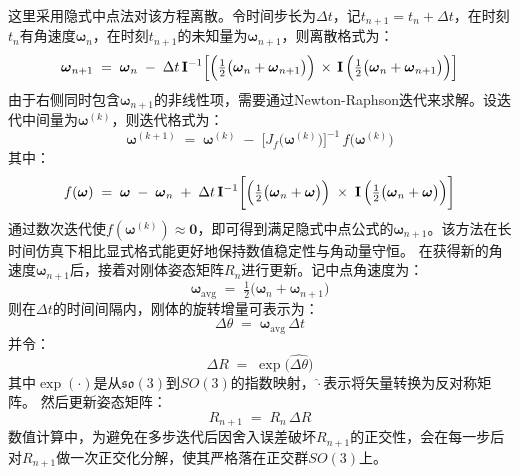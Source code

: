 这里采用隐式中点法对该方程离散。令时间步长为$\Delta t$，记$t_{n+1} = t_n + \Delta t$，在时刻$t_n$有角速度$\boldsymbol{\omega}_n$，在时刻$t_{n+1}$的未知量为$\boldsymbol{\omega}_{n+1}$，则离散格式为：
\begin{equation}\label{eq:midpoint_formula}
	\boldsymbol{\omega}_{n+1}
	\;=\;
	\boldsymbol{\omega}_{n}
	\;-\;
	\Delta t\,\mathbf{I}^{-1}\Bigl[
	\Bigl(\tfrac12\bigl(\boldsymbol{\omega}_{n}+\boldsymbol{\omega}_{n+1}\bigr)\Bigr)
	\,\times\,
	\mathbf{I}\,\Bigl(\tfrac12\bigl(\boldsymbol{\omega}_{n}+\boldsymbol{\omega}_{n+1}\bigr)\Bigr)
	\Bigr]
\end{equation}
由于右侧同时包含$\boldsymbol{\omega}_{n+1}$的非线性项，需要通过Newton-Raphson迭代来求解。设迭代中间量为$\boldsymbol{\omega}^{(k)}$，则迭代格式为：
\begin{equation}
	\boldsymbol{\omega}^{(k+1)}
	\;=\;
	\boldsymbol{\omega}^{(k)}
	\;-\;
	\bigl[J_f\bigl(\boldsymbol{\omega}^{(k)}\bigr)\bigr]^{-1}
	\,f\bigl(\boldsymbol{\omega}^{(k)}\bigr)
\end{equation}
其中：
\begin{equation}
	f(\boldsymbol{\omega})
	\;=\;
	\boldsymbol{\omega}
	\;-\;
	\boldsymbol{\omega}_n
	\;+\;
	\Delta t\,\mathbf{I}^{-1}\biggl[
	\Bigl(\tfrac12\bigl(\boldsymbol{\omega}_n + \boldsymbol{\omega}\bigr)\Bigr)
	\;\times\;
	\mathbf{I}\,
	\Bigl(\tfrac12\bigl(\boldsymbol{\omega}_n + \boldsymbol{\omega}\bigr)\Bigr)
	\biggr]
\end{equation}
通过数次迭代使$f(\boldsymbol{\omega}^{(k)}) \approx \mathbf{0}$，即可得到满足隐式中点公式的$\boldsymbol{\omega}_{n+1}$。该方法在长时间仿真下相比显式格式能更好地保持数值稳定性与角动量守恒。
在获得新的角速度$\boldsymbol{\omega}_{n+1}$后，接着对刚体姿态矩阵$R_n$进行更新。记中点角速度为：
\begin{equation}
	\boldsymbol{\omega}_{\mathrm{avg}}
	\;=\;
	\tfrac12\bigl(
	\boldsymbol{\omega}_n + \boldsymbol{\omega}_{n+1}
	\bigr)
\end{equation}
则在$\Delta t$的时间间隔内，刚体的旋转增量可表示为：
\begin{equation}
	\Delta \theta
	\;=\;
	\boldsymbol{\omega}_{\mathrm{avg}}\,\Delta t
\end{equation}
并令：
\begin{equation}
	\Delta R
	\;=\;
	\exp\bigl(\widehat{\Delta \theta}\bigr)
\end{equation}
其中$\exp(\cdot)$是从$\mathfrak{so}(3)$到$SO(3)$的指数映射，$\widehat{\cdot}$表示将矢量转换为反对称矩阵。	
然后更新姿态矩阵：
\begin{equation}
	R_{n+1}
	\;=\;
	R_{n}\,\Delta R
\end{equation}
数值计算中，为避免在多步迭代后因舍入误差破坏$R_{n+1}$的正交性，会在每一步后对$R_{n+1}$做一次正交化分解，使其严格落在正交群$SO(3)$上。

